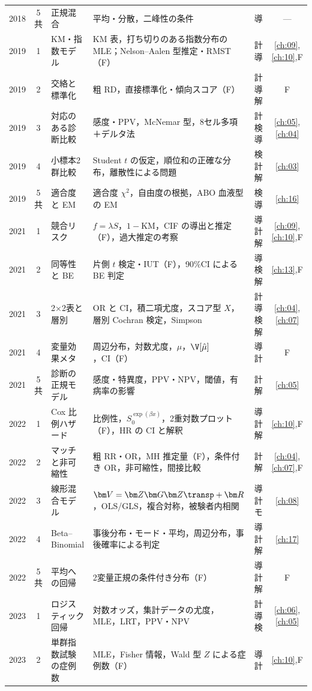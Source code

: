 \begin{center}
\begin{longtable}{@{}ccL{36mm}L{58mm}L{16mm}c@{}}
2018 & 5共 & 正規混合 & 平均・分散，二峰性の条件 & 導 & ---\\
2019 & 1 & KM・指数モデル & KM 表，打ち切りのある指数分布の MLE；Nelson--Aalen 型推定・RMST（F） & 計 導 & \ref{ch:09},\ref{ch:10},F\\
2019 & 2 & 交絡と標準化 & 粗 RD，直接標準化・傾向スコア（F） & 計 導 解 & F\\
2019 & 3 & 対応のある診断比較 & 感度・PPV，McNemar 型，8セル多項＋デルタ法 & 計 検 導 & \ref{ch:05},\ref{ch:04}\\
2019 & 4 & 小標本2群比較 & Student $t$ の仮定，順位和の正確な分布，離散性による問題 & 検 計 解 & \ref{ch:03}\\
2019 & 5共 & 適合度と EM & 適合度 $\chi^2$，自由度の根拠，ABO 血液型の EM & 検 導 & \ref{ch:16}\\
2021 & 1 & 競合リスク & $f=\lambda S$，$1-$KM，CIF の導出と推定（F），過大推定の考察 & 導 計 解 & \ref{ch:09},\ref{ch:10},F\\
2021 & 2 & 同等性と BE & 片側 $t$ 検定・IUT（F），90\%CI による BE 判定 & 導 検 解 & \ref{ch:13},F\\
2021 & 3 & 2×2表と層別 & OR と CI，積二項尤度，スコア型 $X$，層別 Cochran 検定，Simpson & 計 導 検 解 & \ref{ch:04},\ref{ch:07}\\
2021 & 4 & 変量効果メタ & 周辺分布，対数尤度，$\hat\mu$，$\V[\hat\mu]$，CI（F） & 導 計 & F\\
2021 & 5共 & 診断の正規モデル & 感度・特異度，PPV・NPV，閾値，有病率の影響 & 計 解 & \ref{ch:05}\\
2022 & 1 & Cox 比例ハザード & 比例性，$S_0^{\exp(\beta x)}$，2重対数プロット（F），HR の CI と解釈 & 導 計 解 & \ref{ch:10},F\\
2022 & 2 & マッチと非可縮性 & 粗 RR・OR，MH 推定量（F），条件付き OR，非可縮性，間接比較 & 計 解 & \ref{ch:04},\ref{ch:07},F\\
2022 & 3 & 線形混合モデル & $\bm V=\bm Z\bm G\bm Z\transp+\bm R$，OLS/GLS，複合対称，被験者内相関 & 導 計 モ & \ref{ch:08}\\
2022 & 4 & Beta--Binomial & 事後分布・モード・平均，周辺分布，事後確率による判定 & 導 計 解 & \ref{ch:17}\\
2022 & 5共 & 平均への回帰 & 2変量正規の条件付き分布（F） & 導 計 解 & F\\
2023 & 1 & ロジスティック回帰 & 対数オッズ，集計データの尤度，MLE，LRT，PPV・NPV & 計 導 検 & \ref{ch:06},\ref{ch:05}\\
2023 & 2 & 単群指数試験の症例数 & MLE，Fisher 情報，Wald 型 $Z$ による症例数（F） & 導 計 & \ref{ch:10},F\\

\end{longtable}
\end{center}
